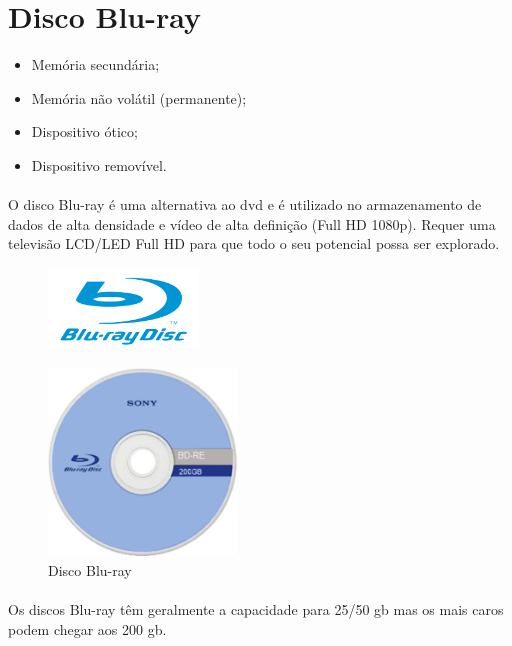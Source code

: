 \documentclass[a4paper]{report}
\begin{document}
\newpage

\section{Disco Blu-ray}
\label{sect.bluray}

\begin{itemize}
\item Memória secundária;
\item Memória não volátil (permanente);
\item Dispositivo ótico;
\item Dispositivo removível.
\end{itemize}

\paragraph*{}O disco Blu-ray é uma alternativa ao \ac{dvd} e é utilizado no armazenamento de dados de alta densidade e vídeo de alta definição (Full HD 1080p). Requer uma televisão LCD/LED Full HD para que todo o seu potencial possa ser explorado.

\begin{figure}[H]
\center
\includegraphics[width=4cm]{Imagens/bluray_logo.png}
\end{figure}

\begin{figure}[H]
\center
\includegraphics[width=5cm]{Imagens/bluray.png}
\caption{Disco Blu-ray}
\end{figure}

\paragraph*{}Os discos Blu-ray têm geralmente a capacidade para 25/50 \ac{gb} mas os mais caros podem chegar aos 200 \ac{gb}.
\end{document}
